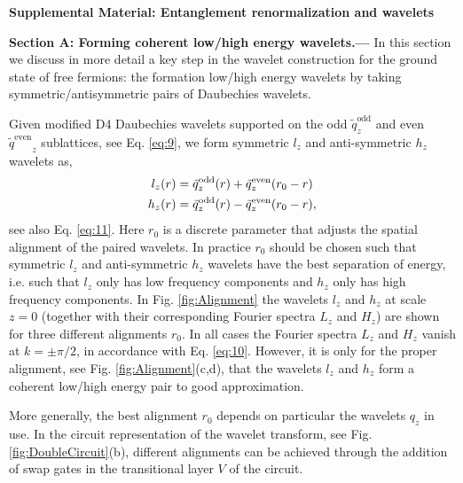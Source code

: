 \documentclass[aps,prl,twocolumn,showpacs,superscriptaddress,floatfix,10pt]{revtex4-1}
\begin{document}
\newpage

\begin{widetext}
{{\Large {\textbf{ Supplemental Material: Entanglement renormalization and wavelets}}}}
\end{widetext}

\renewcommand\thefigure{A.\arabic{figure}}    
\renewcommand{\theequation}{A.\arabic{equation}}
\setcounter{figure}{0}  
\setcounter{equation}{0} 

\textbf{Section A: Forming coherent low/high energy wavelets.---}
In this section we discuss in more detail a key step in the wavelet
construction for the ground state of free fermions: the formation low/high
energy wavelets by taking symmetric/antisymmetric pairs of Daubechies wavelets.  

Given modified D4 Daubechies wavelets supported on the odd ${{\tilde
q}_z^\textrm{odd}}$ and even ${{\tilde q^\textrm{even}}_z}$ sublattices, see
Eq. \ref{eq:9}, we form symmetric $l_z$ and anti-symmetric $h_z$ wavelets as,
\begin{align}
  {l_z}(r) &= {{\tilde q}_z^\textrm{odd}}(r) + {{\tilde q^\textrm{even}}_z}({r_0} - r) \hfill \nonumber \\
  {h_z}(r) &= {{\tilde q}_z^\textrm{odd}}(r) - {{\tilde q^\textrm{even}}_z}({r_0} - r) \hfill, \label{eq:C1}
\end{align}
see also Eq. \ref{eq:11}. Here $r_0$ is a discrete parameter that adjusts the
spatial alignment of the paired wavelets. In practice $r_0$ should be chosen
such that symmetric $l_z$ and anti-symmetric $h_z$ wavelets have the best
separation of energy, i.e. such that $l_z$ only has low frequency components
and $h_z$ only has high frequency components. In Fig. \ref{fig:Alignment} the
wavelets $l_z$ and $h_z$ at scale $z=0$ (together with their corresponding
Fourier spectra $L_z$ and $H_z$) are shown for three different alignments
$r_0$. In all cases the Fourier spectra $L_z$ and $H_z$ vanish at 
$k = \pm \pi/2$, in accordance with Eq. \ref{eq:10}. However, it is only for the proper
alignment, see Fig. \ref{fig:Alignment}(c,d), that the wavelets $l_z$ and $h_z$
form a coherent low/high energy pair to good approximation.

More generally, the best alignment $r_0$ depends on particular the wavelets
$q_z$ in use. In the circuit representation of the wavelet transform, see
Fig. \ref{fig:DoubleCircuit}(b), different alignments can be achieved through
the addition of swap gates in the transitional layer $V$ of the circuit.  
\end{document}
